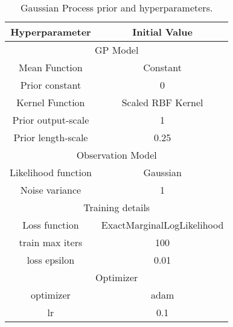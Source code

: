 \begin{table}[!h]
	\caption{Gaussian Process prior and hyperparameters.}
	\vspace*{-2ex}
	\label{tab:gp_prior}
	\begin{center}
		\begin{tabular}{|c|c|}
			\hline
			Hyperparameter\cellcolor[gray]{0.6} & Initial Value \cellcolor[gray]{0.6} \\ \hline
\multicolumn{2}{|c|}{\cellcolor[gray]{0.9} GP Model}\\ \hline 
Mean Function & Constant \\ \hline 
Prior constant & 0 \\ \hline 
Kernel Function & Scaled RBF Kernel \\ \hline 
Prior output-scale & 1 \\ \hline 
Prior length-scale & 0.25 \\ \hline
\multicolumn{2}{|c|}{\cellcolor[gray]{0.9} Observation Model}\\ \hline 
Likelihood function & Gaussian \\ \hline 
Noise variance & 1 \\ \hline 
\multicolumn{2}{|c|}{\cellcolor[gray]{0.9} Training details}\\ \hline 
Loss function & ExactMarginalLogLikelihood \\ \hline 
train max iters & 100 \\ \hline 
loss epsilon & 0.01 \\ \hline 
\multicolumn{2}{|c|}{\cellcolor[gray]{0.9} Optimizer } \\ \hline 
optimizer & adam \\ \hline 
lr & 0.1 \\ \hline 
		\end{tabular}
	\end{center}
\end{table}